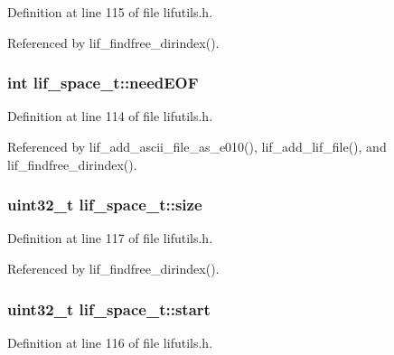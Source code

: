 Definition at line 115 of file lifutils.\+h.



Referenced by lif\+\_\+findfree\+\_\+dirindex().

\subsubsection[{\texorpdfstring{need\+E\+OF}{needEOF}}]{\setlength{\rightskip}{0pt plus 5cm}int lif\+\_\+space\+\_\+t\+::need\+E\+OF}\hypertarget{structlif__space__t_abfeae53ab4c770b3a29cfb399243b24e}{}\label{structlif__space__t_abfeae53ab4c770b3a29cfb399243b24e}


Definition at line 114 of file lifutils.\+h.



Referenced by lif\+\_\+add\+\_\+ascii\+\_\+file\+\_\+as\+\_\+e010(), lif\+\_\+add\+\_\+lif\+\_\+file(), and lif\+\_\+findfree\+\_\+dirindex().

\subsubsection[{\texorpdfstring{size}{size}}]{\setlength{\rightskip}{0pt plus 5cm}uint32\+\_\+t lif\+\_\+space\+\_\+t\+::size}\hypertarget{structlif__space__t_a3175f877e02438340a5da584bbd8fed6}{}\label{structlif__space__t_a3175f877e02438340a5da584bbd8fed6}


Definition at line 117 of file lifutils.\+h.



Referenced by lif\+\_\+findfree\+\_\+dirindex().

\subsubsection[{\texorpdfstring{start}{start}}]{\setlength{\rightskip}{0pt plus 5cm}uint32\+\_\+t lif\+\_\+space\+\_\+t\+::start}\hypertarget{structlif__space__t_a23b61454ad7e0d9b08019a4a65723dac}{}\label{structlif__space__t_a23b61454ad7e0d9b08019a4a65723dac}


Definition at line 116 of file lifutils.\+h.




